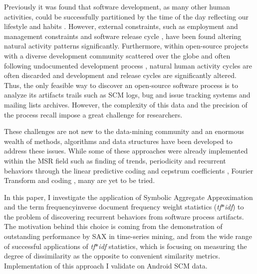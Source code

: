 \documentclass[conference]{IEEEtran}
\begin{document}
Previously it was found that software development, as many other human activities,
could be successfully partitioned by the time of the day reflecting our lifestyle and habits
\cite{citeulike:10396459} \cite{citeulike:10392305}. However, external constraints, 
such as employment and management constraints \cite{citeulike:6095797} and
software release cycle \cite{citeulike:2739216},  have been found altering 
natural activity patterns significantly. Furthermore, within open-source 
projects with a diverse development community scattered over the globe and 
often following undocumented development process \cite{citeulike:10377366}, natural human 
activity cycles are often discarded and development and release cycles are significantly altered.
Thus, the only feasible way to discover an open-source software process is to analyze 
its artifacts trails such as SCM logs, bug and issue tracking systems and 
mailing lists archives. However, the complexity of this data and the precision 
of the process recall impose a great challenge for researchers.

These challenges are not new to the data-mining community and an enormous wealth 
of methods, algorithms and data structures have been developed to address these issues.
While some of these approaches were already implemented within the MSR field \cite{citeulike:7853299}  
such as finding of trends, periodicity and recurrent behaviors through the linear 
predictive coding and cepstrum coefficients \cite{citeulike:3378725}, 
Fourier Transform \cite{citeulike:10377345} and coding \cite{citeulike:10377366},
many are yet to be tried.

In this paper, I investigate the application of 
Symbolic Aggregate Approximation \cite{citeulike:2821475} and the 
term frequency\textendash inverse document frequency weight statistics (\textit{tf$\ast$idf})
\cite{citeulike:3056638} to the problem of discovering recurrent 
behaviors from software process artifacts. The motivation behind this choice is coming
from the demonstration of outstanding performance by SAX in time-series mining, 
and from the wide range of successful applications of \textit{tf$\ast$idf} 
statistics, which is focusing on measuring the degree of dissimilarity 
as the opposite to convenient similarity metrics. Implementation of this approach I 
validate on Android SCM data.
\end{document}
